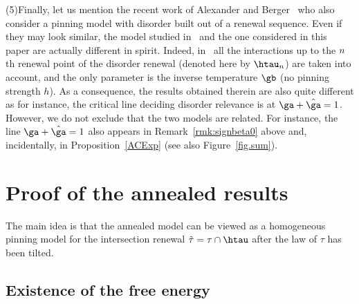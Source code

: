 \noindent (5)\enskip Finally, let us mention the recent work of Alexander and Berger~\cite{A17_1} who also consider a pinning model with disorder built out of a renewal sequence. Even if they may look similar, the model studied in~\cite{A17_1} and the one considered in this paper are actually different in spirit. Indeed, in~\cite{A17_1} all the interactions up to the $n\mskip 1mu$th renewal point of the disorder renewal (denoted here by $\htau_n$) are taken into account, and the only parameter is the inverse temperature $\gb$ (no pinning strength $h$). As a consequence, the results obtained therein are also quite different as for instance, the critical line deciding disorder relevance is at $\ga + \hat \ga = 1$. However, we do not exclude that the two models are related. For instance, the line $\ga + \hat \ga = 1$ also appears in Remark~\ref{rmk:signbeta0} above and, incidentally, in Proposition~\ref{ACExp} (see also Figure~\ref{fig.sum}).

\section{Proof of the annealed results}\label{sec3}

The main idea is that the annealed model can be viewed as a homogeneous pinning model for the intersection renewal $\tilde\tau = \tau \cap \htau$ after the law of $\tau$ has been tilted.

\subsection{Existence of the free energy}\label{sec3.1}

